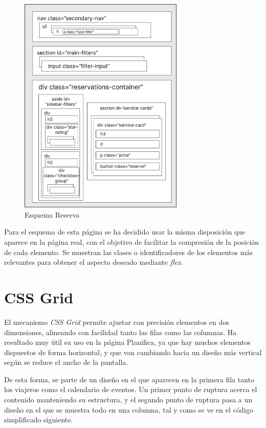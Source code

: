 \documentclass[11pt, a4paper]{book}
\begin{document}
	\begin{figure} [H]
		\centering
		\includegraphics[width=0.7\textwidth]{CSS/CSS Reserva.jpg}
		\caption{Esquema Reserva}
	\end{figure}
	
    Para el esquema de esta página se ha decidido usar la misma disposición que aparece en la página real, con el objetivo de facilitar la compresión de la posición de cada elemento. Se muestran las clases o identificadores de los elementos más relevantes para obtener el aspecto deseado mediante \textit{flex}.

	\section{CSS Grid}
	El mecanismo \textit{CSS Grid} permite ajustar con precisión elementos en dos dimensiones, alineando con facilidad tanto las filas como las columnas. Ha resultado muy útil su uso en la página Planifica, ya que hay muchos elementos dispuestos de forma horizontal, y que van cambiando hacia un diseño más vertical según se reduce el ancho de la pantalla.
	
	De esta forma, se parte de un diseño en el que aparecen en la primera fila tanto los viajeros como el calendario de eventos. Un primer punto de ruptura acerca el contenido manteniendo su estructura, y el segundo punto de ruptura pasa a un diseño en el que se muestra todo en una columna, tal y como se ve en el código simplificado siguiente. 
	
\end{document}
